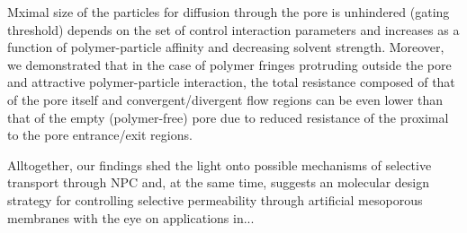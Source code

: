 \documentclass[12pt, a4paper]{article}
\begin{document}
Mximal size of the particles for diffusion through the pore is unhindered (gating threshold)  depends on the set of control interaction parameters and increases as a function of polymer-particle
affinity and decreasing solvent strength.
Moreover, we demonstrated that in the case of polymer fringes protruding outside the pore and attractive polymer-particle interaction, the total resistance composed of that of the pore itself 
and convergent/divergent flow regions can be even lower than that of the
empty (polymer-free) pore due to reduced resistance of the proximal to the pore entrance/exit regions.



Alltogether, our findings shed the light onto possible mechanisms of selective transport through NPC and, at the same time, suggests an molecular design strategy for controlling selective
permeability through artificial mesoporous membranes with the eye on applications in...



\printbibliography
\end{document}
